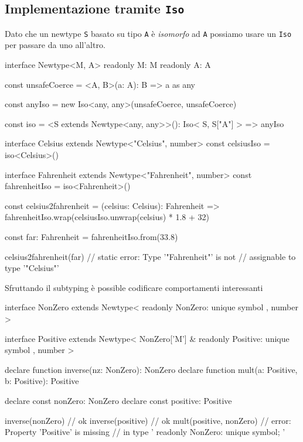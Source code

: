 \documentclass[12pt]{article}
\theoremstyle{definition}
\newenvironment{code}
  {\vspace{0.5cm} \VerbatimEnvironment\begin{typescriptcode}}
  {\end{typescriptcode} \vspace{0.2cm}}
\begin{document}
\subsection{Implementazione tramite \texttt{Iso}}

Dato che un newtype \texttt{S} basato su tipo \texttt{A} è \emph{isomorfo} ad \texttt{A} possiamo usare un
\texttt{Iso} per passare da uno all'altro.

\begin{code}
interface Newtype<M, A> {
  readonly M: M
  readonly A: A
}

const unsafeCoerce = <A, B>(a: A): B => a as any

const anyIso = new Iso<any, any>(unsafeCoerce, unsafeCoerce)

const iso = <S extends Newtype<any, any>>(): Iso<
  S,
  S["A"]
> => anyIso

interface Celsius extends Newtype<"Celsius", number> {}
const celsiusIso = iso<Celsius>()

interface Fahrenheit extends Newtype<"Fahrenheit", number> {}
const fahrenheitIso = iso<Fahrenheit>()

const celsius2fahrenheit = (celsius: Celsius): Fahrenheit =>
  fahrenheitIso.wrap(celsiusIso.unwrap(celsius) * 1.8 + 32)

const far: Fahrenheit = fahrenheitIso.from(33.8)

celsius2fahrenheit(far)
// static error: Type '"Fahrenheit"' is not
// assignable to type '"Celsius"'
\end{code}

Sfruttando il subtyping è possible codificare comportamenti interessanti

\begin{code}
interface NonZero
  extends Newtype<
      { readonly NonZero: unique symbol },
      number
    > {}

interface Positive
  extends Newtype<
      NonZero['M'] & {
        readonly Positive: unique symbol
      },
      number
    > {}

declare function inverse(nz: NonZero): NonZero
declare function mult(a: Positive, b: Positive): Positive

declare const nonZero: NonZero
declare const positive: Positive

inverse(nonZero) // ok
inverse(positive) // ok
mult(positive, nonZero)
// error: Property 'Positive' is missing
// in type '{ readonly NonZero: unique symbol; }'
\end{code}
\end{document}
